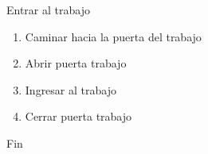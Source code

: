 \item Entrar al trabajo
  \begin{enumerate}
  \def\labelenumi{\arabic{enumi}.}
  \setcounter{enumii}{2}
  \tightlist
  \item Caminar hacia la puerta del trabajo
  \item Abrir puerta trabajo
  \item Ingresar al trabajo
  \item Cerrar puerta trabajo
  \end{enumerate}
  \item Fin